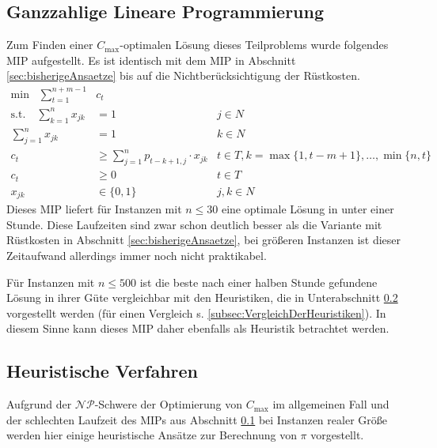 \documentclass{scrreprt}
\begin{document}
\subsection{Ganzzahlige Lineare Programmierung}
\label{subsec:LineareProgrammierung}
Zum Finden einer $C_{\max}$-optimalen Lösung dieses Teilproblems wurde folgendes MIP aufgestellt.
Es ist identisch mit dem MIP in Abschnitt \ref{sec:bisherigeAnsaetze} bis auf die Nichtberücksichtigung der Rüstkosten.
\begin{align}
    \text{min} \quad \sum_{t=1}^{n+m-1} &c_t \\
    \text{s.t.}\quad \sum_{k=1}^n x_{jk} &= 1 & j\in N \\
                     \sum_{j=1}^n x_{jk} &= 1 & k\in N \\
    c_t &\geq \sum_{j=1}^n p_{t-k+1,j} \cdot x_{jk} & t\in T, k=\max\{1,t-m+1\},\ldots,\min\{n,t\} \\
    c_t &\geq 0 & t\in T \\
    x_{jk} &\in \{0,1\} & j,k\in N
\end{align}
Dieses MIP liefert für Instanzen mit $n\leq 30$ eine optimale Lösung in unter einer Stunde.
Diese Laufzeiten sind zwar schon deutlich besser als die Variante mit Rüstkosten in Abschnitt \ref{sec:bisherigeAnsaetze},
bei größeren Instanzen ist dieser Zeitaufwand allerdings immer noch nicht praktikabel. 

Für Instanzen mit $n\leq 500$ ist die beste nach einer halben Stunde gefundene Lösung in ihrer Güte vergleichbar mit den Heuristiken,
die in Unterabschnitt \ref{subsec:HeuristischeVerfahren} vorgestellt werden (für einen Vergleich s. \ref{subsec:VergleichDerHeuristiken}).
In diesem Sinne kann dieses MIP daher ebenfalls als Heuristik betrachtet werden.


\subsection{Heuristische Verfahren}
\label{subsec:HeuristischeVerfahren}
Aufgrund der $\mathcal{NP}$-Schwere der Optimierung von $C_{\max}$ im allgemeinen Fall und der schlechten Laufzeit des MIPs aus Abschnitt \ref{subsec:LineareProgrammierung}
bei Instanzen realer Größe werden hier einige heuristische Ansätze zur Berechnung von $\pi$ vorgestellt.
\end{document}
